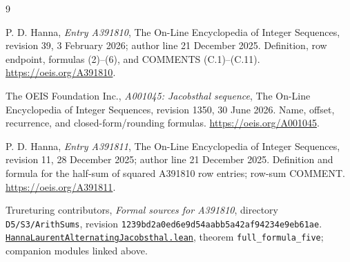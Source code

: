 \documentclass[11pt]{article}
\begin{document}
\begin{thebibliography}{9}
\raggedright
{}
P. D. Hanna, \emph{Entry A391810}, The On-Line Encyclopedia of Integer Sequences,
revision 39, 3 February 2026; author line 21 December 2025.
Definition, row endpoint, formulas (2)--(6), and COMMENTS (C.1)--(C.11).
\url{https://oeis.org/A391810}.

The OEIS Foundation Inc., \emph{A001045: Jacobsthal sequence},
The On-Line Encyclopedia of Integer Sequences,
revision 1350, 30 June 2026.
Name, offset, recurrence, and closed-form/rounding formulas.
\url{https://oeis.org/A001045}.

P. D. Hanna, \emph{Entry A391811}, The On-Line Encyclopedia of Integer Sequences,
revision 11, 28 December 2025; author line 21 December 2025.
Definition and formula for the half-sum of squared A391810 row entries;
row-sum COMMENT.
\url{https://oeis.org/A391811}.

Trureturing contributors,
\emph{Formal sources for A391810}, directory \texttt{D5/S3/ArithSums}, revision
\nolinkurl{1239bd2a0ed6e9d54aabb5a42af94234e9eb61ae}.
\href{https://github.com/the-omega-institute/trureturing/blob/1239bd2a0ed6e9d54aabb5a42af94234e9eb61ae/D5/S3/ArithSums/HannaLaurentAlternatingJacobsthal.lean}{\texttt{HannaLaurentAlternatingJacobsthal.lean}}, theorem
\texttt{full\_formula\_five}; companion modules linked above.
\end{thebibliography}
\end{document}
